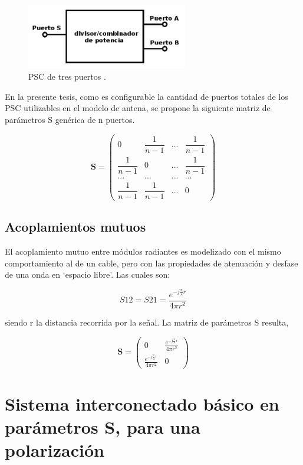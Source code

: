 \begin{figure}[H]
 \centering
 \includegraphics[width=7cm]{gfx/3PortsPSC.png}
 \caption{PSC de tres puertos \cite{MiniCircuits2015}.}
 \label{fig:3PortsPSC}
\end{figure}

En la presente tesis, como es configurable la cantidad de puertos totales de los PSC utilizables en el modelo de antena, se 
propone la siguiente matriz de parámetros S genérica de n puertos.

$$
\mathbf{S} = \begin{pmatrix} 0 & \dfrac{1}{n-1} & ... & \dfrac{1}{n-1}\\
							 \dfrac{1}{n-1} & 0 & ... & \dfrac{1}{n-1}\\
							 ... & ... & ... & ... \\
							 \dfrac{1}{n-1} & \dfrac{1}{n-1} & ... & 0 \end{pmatrix}
$$

\subsection{Acoplamientos mutuos}

El acoplamiento mutuo entre módulos radiantes es modelizado con el mismo comportamiento al de un cable, pero con las
propiedades de atenuación y desfase de una onda en \enquote*{espacio libre}. Las cuales son:

\begin{equation}
	S12 = S21 = \dfrac{e^{-j\frac{\pi}{\lambda}r}}{4\pi r^2}
\end{equation}

siendo r la distancia recorrida por la señal. La matriz de parámetros S resulta,

$$
\mathbf{S} = \begin{pmatrix} 0 & \frac{e^{-j\frac{\pi}{\lambda}r}}{4\pi r^2}\\\frac{e^{-j\frac{\pi}{\lambda}r}}{4\pi r^2} & 0\end{pmatrix}
$$

\section{Sistema interconectado básico en parámetros S, para una polarización}

